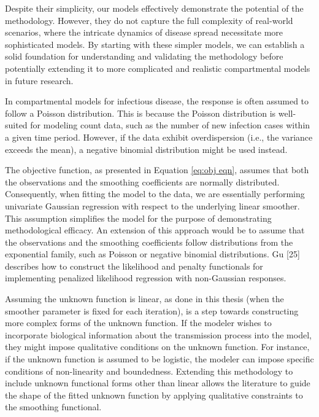 \documentclass[
11pt, %
oneside, %
english, %
singlespacing, %
]{macthesis} %
\begin{document}
Despite their simplicity, our models effectively demonstrate the potential of the methodology. However, they do not capture the full complexity of real-world scenarios, where the intricate dynamics of disease spread necessitate more sophisticated models. By starting with these simpler models, we can establish a solid foundation for understanding and validating the methodology before potentially extending it to more complicated and realistic compartmental models in future research.

In compartmental models for infectious disease, the response is often assumed to follow a Poisson distribution. This is because the Poisson distribution is well-suited for modeling count data, such as the number of new infection cases within a given time period. However, if the data exhibit overdispersion (i.e., the variance exceeds the mean), a negative binomial distribution might be used instead.

The objective function, as presented in Equation \ref{eq:obj eqn}, assumes that both the observations and the smoothing coefficients are normally distributed. Consequently, when fitting the model to the data, we are essentially performing univariate Gaussian regression with respect to the underlying linear smoother. This assumption simplifies the model for the purpose of demonstrating methodological efficacy. An extension of this approach would be to assume that the observations and the smoothing coefficients follow distributions from the exponential family, such as Poisson or negative binomial distributions. Gu {[}25{]} describes how to construct the likelihood and penalty functionals for implementing penalized likelihood regression with non-Gaussian responses.

Assuming the unknown function is linear, as done in this thesis (when the smoother parameter is fixed for each iteration), is a step towards constructing more complex forms of the unknown function. If the modeler wishes to incorporate biological information about the transmission process into the model, they might impose qualitative conditions on the unknown function. For instance, if the unknown function is assumed to be logistic, the modeler can impose specific conditions of non-linearity and boundedness. Extending this methodology to include unknown functional forms other than linear allows the literature to guide the shape of the fitted unknown function by applying qualitative constraints to the smoothing functional.
\end{document}
